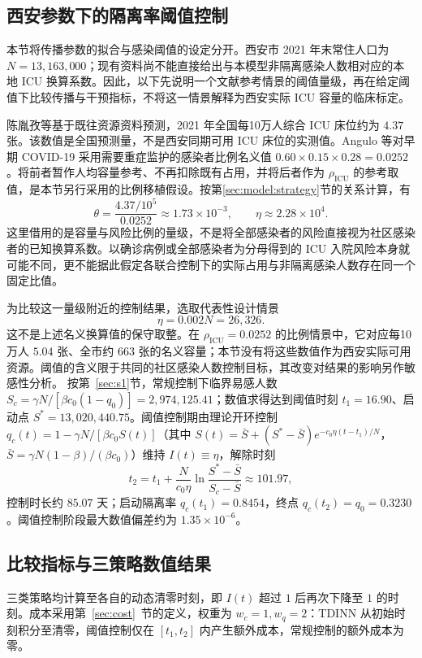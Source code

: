 \documentclass[lang=cn,a4paper,newtx]{elegantpaper}
\numberwithin{equation}{section}
\theoremstyle{plain}
\begin{document}
\subsection{西安参数下的隔离率阈值控制}
\label{sec:xian:threshold-scale}
本节将传播参数的拟合与感染阈值的设定分开。西安市 2021 年末常住人口为 $N=13{,}163{,}000$\cite{XianStat2021}；现有资料尚不能直接给出与本模型非隔离感染人数相对应的本地 ICU 换算系数。因此，以下先说明一个文献参考情景的阈值量级，再在给定阈值下比较传播与干预指标，不将这一情景解释为西安实际 ICU 容量的临床标定。

陈胤孜等\cite{Chen2021ICUForecast}基于既往资源资料预测，2021 年全国每10万人综合 ICU 床位约为 $4.37$ 张。该数值是全国预测量，不是西安同期可用 ICU 床位的实测值。Angulo 等\cite[补充材料 S4.1]{Angulo2021}对早期 COVID-19 采用需要重症监护的感染者比例名义值 $0.60\times0.15\times0.28=0.0252$。将前者暂作人均容量参考、不再扣除既有占用，并将后者作为 $\rho_{\mathrm{ICU}}$ 的参考取值，是本节另行采用的比例移植假设。按第\ref{sec:model:strategy}节的关系计算，有
\[
\theta=\frac{4.37/10^5}{0.0252}\approx1.73\times10^{-3},
\qquad \eta\approx2.28\times10^4.
\]
这里借用的是容量与风险比例的量级，不是将全部感染者的风险直接视为社区感染者的已知换算系数。以确诊病例或全部感染者为分母得到的 ICU 入院风险本身就可能不同\cite{Pung2023Undetected}，更不能据此假定各联合控制下的实际占用与非隔离感染人数存在同一个固定比值。

为比较这一量级附近的控制结果，选取代表性设计情景
\begin{equation}
\eta=0.002N=26{,}326.
\end{equation}
这不是上述名义换算值的保守取整。在 $\rho_{\mathrm{ICU}}=0.0252$ 的比例情景中，它对应每10万人 $5.04$ 张、全市约 $663$ 张的名义容量；本节没有将这些数值作为西安实际可用资源。阈值的含义限于共同的社区感染人数控制目标，其改变对结果的影响另作敏感性分析。
按第~\ref{sec:s1}节，常规控制下临界易感人数 $S_c=\gamma N/[\beta c_0(1-q_0)]=2{,}974{,}125.41$；数值求得达到阈值时刻 $t_1=16.90$、启动点 $S^*=13{,}020{,}440.75$。阈值控制期由理论开环控制 $q_c(t)=1-\gamma N/[\beta c_0 S(t)]$（其中 $S(t)=\bar S+(S^*-\bar S)e^{-c_0\eta(t-t_1)/N}$，$\bar S=\gamma N(1-\beta)/(\beta c_0)$）维持 $I(t)\equiv\eta$，解除时刻
\[
t_2=t_1+\frac{N}{c_0\eta}\ln\frac{S^*-\bar S}{S_c-\bar S}\approx101.97,
\]
控制时长约 $85.07$ 天；启动隔离率 $q_c(t_1)=0.8454$，终点 $q_c(t_2)=q_0=0.3230$。阈值控制阶段最大数值偏差约为 $1.35\times10^{-6}$。

\subsection{比较指标与三策略数值结果}
三类策略均计算至各自的动态清零时刻，即 $I(t)$ 超过 $1$ 后再次下降至 $1$ 的时刻。成本采用第~\ref{sec:cost}~节的定义，权重为 $w_c=1,w_q=2$：TDINN 从初始时刻积分至清零，阈值控制仅在 $[t_1,t_2]$ 内产生额外成本，常规控制的额外成本为零。
\end{document}
